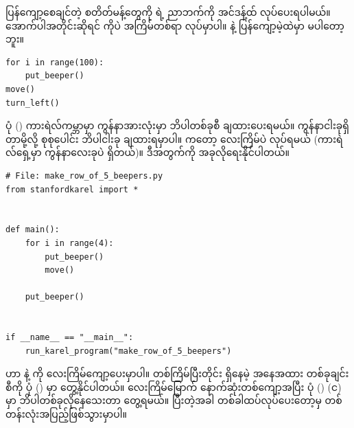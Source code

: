 \begin{mytcbox}
ပြန်ကျော့စေချင်တဲ့ စတိတ်မန့်တွေကို  ရဲ့ ညာဘက်ကို အင်ဒန့်ထ် လုပ်ပေးရပါမယ်။ အောက်ပါအတိုင်းဆိုရင်  ကိုပဲ အကြိမ်တစ်ရာ လုပ်မှာပါ။  နဲ့  ပြန်ကျော့မဲ့ထဲမှာ မပါတော့ဘူး။
\setlength{\fboxsep}{0pt}
\begin{verbatim}
for i in range(100):
    put_beeper()
move()
turn_left()
\end{verbatim}
\end{mytcbox}

%
\begin{figure}[tbh!]
\caption{} 
\label{fig:mrofb-bef}
\end{figure}
%
ပုံ (\fRefNo{\ref{fig:mrofb-bef}}) ကားရဲလ်ကမ္ဘာမှာ ကွန်နာအားလုံးမှာ ဘိပါတစ်ခုစီ ချထားပေးရမယ်။ ကွန်နာငါးခုရှိတာမို့လို့ စုစုပေါင်း ဘိပါငါးခု ချထားရမှာပါ။  ကတော့ လေးကြိမ်ပဲ လုပ်ရမယ် (ကားရဲလ်ရှေ့မှာ ကွန်နာလေးခုပဲ ရှိတယ်)။ ဒီအတွက်ကို အခုလိုရေးနိုင်ပါတယ်။
%
\setlength{\fboxsep}{0pt}
\begin{verbatim}
# File: make_row_of_5_beepers.py
from stanfordkarel import *


def main():
    for i in range(4):
        put_beeper()
        move()

    put_beeper()


if __name__ == "__main__":
    run_karel_program("make_row_of_5_beepers")

\end{verbatim}
%

  ဟာ  နဲ့  ကို လေးကြိမ်ကျော့ပေးမှာပါ။ တစ်ကြိမ်ပြီးတိုင်း ရှိနေမဲ့ အနေအထား တစ်ခုချင်းစီကို ပုံ (\fRefNo{\ref{fig:mrofb_iters}})  မှာ တွေ့နိုင်ပါတယ်။ လေးကြိမ်မြောက် နောက်ဆုံးတစ်ကျော့အပြီး ပုံ (\fRefNo{\ref{fig:mrofb_iters}}) (င) မှာ ဘိပါတစ်ခုလိုနေသေးတာ တွေ့ရမယ်။   ပြီးတဲ့အခါ  တစ်ခါထပ်လုပ်ပေးတော့မှ တစ်တန်းလုံးအပြည့်ဖြစ်သွားမှာပါ။


